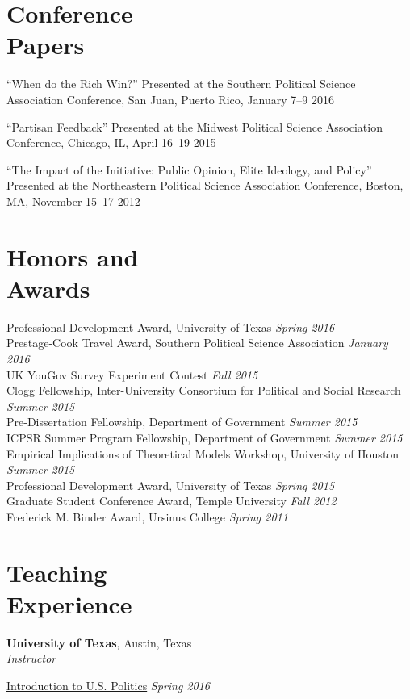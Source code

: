 \documentclass[margin,line]{res}
\newenvironment{list2}{
    \begin{list}{--}{%
        \setlength{\itemsep}{0in}
        \setlength{\parsep}{0in} \setlength{\parskip}{0in}
        \setlength{\topsep}{0in} \setlength{\partopsep}{0in}
        \setlength{\leftmargin}{0.2in}}}{\end{list}}
\begin{document}
\begin{resume}
\section{\sc Conference\\Papers}
\begin{list2}
\item ``When do the Rich Win?'' Presented at the Southern Political
  Science Association Conference, San Juan, Puerto Rico, January 7--9 2016
\item ``Partisan Feedback'' Presented at the Midwest Political Science
  Association Conference, Chicago, IL, April 16--19 2015
\item ``The Impact of the Initiative: Public Opinion, Elite Ideology,
  and Policy'' Presented at the Northeastern Political Science
  Association Conference, Boston, MA, November 15--17 2012
\end{list2}

\section{\sc Honors and \\Awards}
Professional Development Award, University of Texas \hfill
\emph{Spring 2016} \\
Prestage-Cook Travel Award, Southern Political Science Association
\hfill \emph{January 2016} \\
UK YouGov Survey Experiment Contest \hfill \emph{Fall 2015} \\
Clogg Fellowship, Inter-University Consortium for Political and Social
Research \hfill \emph{Summer 2015} \\
Pre-Dissertation Fellowship, Department of Government \hfill
\emph{Summer 2015} \\
ICPSR Summer Program Fellowship, Department of Government \hfill
\emph{Summer 2015} \\
Empirical Implications of Theoretical Models Workshop, University of
Houston  \hfill \emph{Summer 2015} \\
Professional Development Award, University of Texas \hfill
\emph{Spring 2015} \\
Graduate Student Conference Award, Temple University \hfill \emph{Fall
  2012} \\
Frederick M. Binder Award, Ursinus College \hfill \emph{Spring 2011} %

\section{\sc Teaching \\Experience}
\textbf{University of Texas}, Austin, Texas  \\
\emph{Instructor}
\begin{list2}
\item \href{http://jabranham.com/GOV310L}{Introduction to U.S.
    Politics} \hfill \emph{Spring 2016}
\end{list2}


\end{resume}
\end{document}
